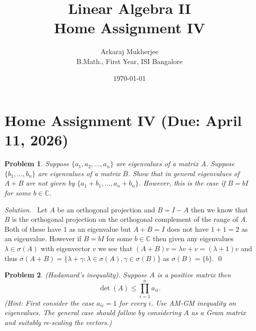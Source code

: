 \documentclass[12pt,a4paper]{article}
\title{\textbf{Linear Algebra II} \\ \large Home Assignment IV}
\author{Arkaraj Mukherjee \\ B.Math., First Year, ISI Bangalore}
\date{\today}
\newenvironment{solution}{%
  \par\noindent\textit{Solution.}\ }{\qed}
\theoremstyle{problemstyle}
\newtheorem{problem}{Problem}[section]
\def\bC{\mathbb{C}}
\begin{document}
\maketitle
\newpage
\tableofcontents
\newpage
\section{Home Assignment IV (Due: April 11, 2026)}
\begin{problem}\label{prob:4-1}
Suppose $\{a_1, a_2, \ldots, a_n\}$ are eigenvalues of a matrix $A$. Suppose $\{b_1, \ldots, b_n\}$ are eigenvalues of a matrix $B$. Show that in general eigenvalues of $A + B$ are not given by $\{a_1 + b_1, \ldots, a_n + b_n\}$. However, this is the case if $B = bI$ for some $b \in \mathbb{C}$.
\end{problem}
\begin{solution}
    Let $A$ be an orthogonal projection and $B=I-A$ then we know that $B$ is the orthogonal projection on the orthogonal complement of the range of $A$. 
	Both of these have $1$ as an eigenvalue but $A+B=I$ does not have $1+1=2$ as an eigenvalue. 
	However if $B=bI$ for some $b\in\bC$ then given any eigenvalues $\lambda\in\sigma(A)$ with eigenvector $v$ we see that $(A+B)v=\lambda v+v=(\lambda+1)v$ and thus $\sigma(A+B)=\{\lambda+\gamma:\lambda\in\sigma(A),\gamma\in\sigma(B)\}$ as $\sigma(B)=\{b\}$. 
\end{solution}
\begin{problem}\label{prob:4-2}
(Hadamard's inequality). Suppose $A$ is a positive matrix then
\[
\det(A) \leq \prod_{i=1}^{n} a_{ii}.
\]
(Hint: First consider the case $a_{ii} = 1$ for every $i$. Use AM-GM inequality on eigenvalues. The general case should follow by considering $A$ as a Gram matrix and suitably re-scaling the vectors.)
\end{problem}
\end{document}
